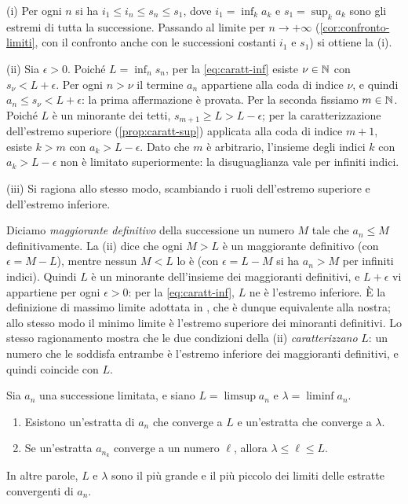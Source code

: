 \begin{dimostrazione}
(i) Per ogni $n$ si ha $i_{1}\le i_{n}\le s_{n}\le s_{1}$, dove $i_{1}=\inf_{k}a_{k}$ e
$s_{1}=\sup_{k}a_{k}$ sono gli estremi di tutta la successione. Passando al limite per
$n\to+\infty$ (\cref{cor:confronto-limiti}, con il confronto anche con le successioni
costanti $i_{1}$ e $s_{1}$) si ottiene la (i).

(ii) Sia $\epsilon>0$. Poiché $L=\inf_{n}s_{n}$, per la \eqref{eq:caratt-inf} esiste
$\nu\in\mathbb{N}$ con $s_{\nu}<L+\epsilon$. Per ogni $n>\nu$ il termine $a_{n}$ appartiene alla
coda di indice $\nu$, e quindi $a_{n}\le s_{\nu}<L+\epsilon$: la prima affermazione è
provata. Per la seconda fissiamo $m\in\mathbb{N}$. Poiché $L$ è un minorante dei tetti,
$s_{m+1}\ge L>L-\epsilon$; per la caratterizzazione dell'estremo superiore
(\cref{prop:caratt-sup}) applicata alla coda di indice $m+1$, esiste $k>m$ con
$a_{k}>L-\epsilon$. Dato che $m$ è arbitrario, l'insieme degli indici $k$ con
$a_{k}>L-\epsilon$ non è limitato superiormente: la disuguaglianza vale per infiniti
indici.

(iii) Si ragiona allo stesso modo, scambiando i ruoli dell'estremo superiore e
dell'estremo inferiore.
\end{dimostrazione}

\begin{osservazione}\label{oss:limsup-giusti}
Diciamo \emph{maggiorante definitivo} della successione un numero $M$ tale che
$a_{n}\le M$ definitivamente. La (ii) dice che ogni $M>L$ è un maggiorante definitivo
(con $\epsilon=M-L$), mentre nessun $M<L$ lo è (con $\epsilon=L-M$ si ha $a_{n}>M$ per
infiniti indici). Quindi $L$ è un minorante dell'insieme dei maggioranti definitivi, e
$L+\epsilon$ vi appartiene per ogni $\epsilon>0$: per la \eqref{eq:caratt-inf}, $L$ ne è
l'estremo inferiore. È la definizione di massimo limite adottata in \cite{giusti}, che è
dunque equivalente alla nostra; allo stesso modo il minimo limite è l'estremo superiore
dei minoranti definitivi. Lo stesso ragionamento mostra che le due condizioni della (ii)
\emph{caratterizzano} $L$: un numero che le soddisfa entrambe è l'estremo inferiore dei
maggioranti definitivi, e quindi coincide con $L$.
\end{osservazione}

\begin{teorema}\label{teo:limsup-estratte}
Sia $a_{n}$ una successione limitata, e siano $L=\limsup a_{n}$ e $\lambda=\liminf a_{n}$.
\begin{enumerate}
  \item Esistono un'estratta di $a_{n}$ che converge a $L$ e un'estratta che converge
  a $\lambda$.
  \item Se un'estratta $a_{n_{k}}$ converge a un numero $\ell$, allora
  $\lambda\le\ell\le L$.
\end{enumerate}
In altre parole, $L$ e $\lambda$ sono il più grande e il più piccolo dei limiti delle
estratte convergenti di $a_{n}$.
\end{teorema}

